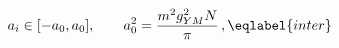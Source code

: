 \begin{equation}
a_i\in [-a_0,a_0],\qquad a_0^2=\frac{m^2 g_{YM}^2 N}{\pi}\,, 
\eqlabel{inter}
\end{equation}

